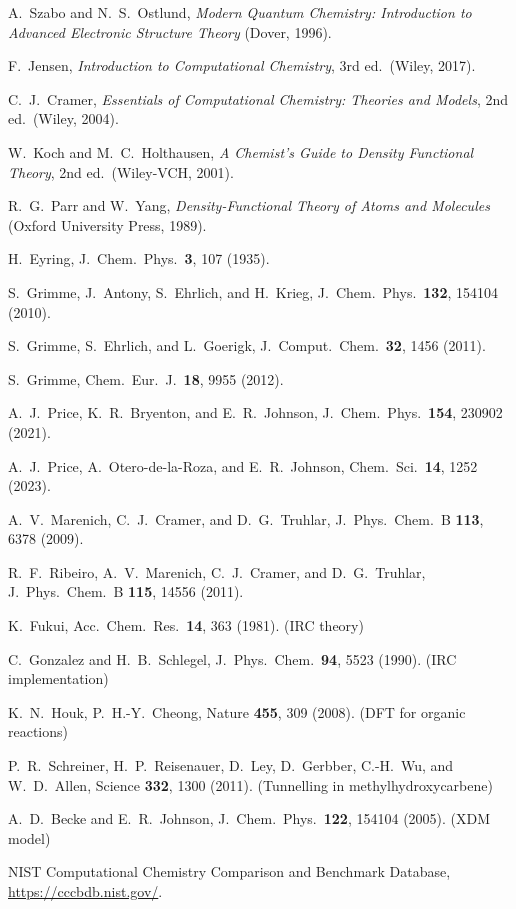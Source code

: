 \documentclass[11pt]{article}
\numberwithin{equation}{section}
\begin{document}
\begin{enumerate}[label={[\arabic*]},leftmargin=*]
 A.\ Szabo and N.\ S.\ Ostlund, \textit{Modern Quantum Chemistry: Introduction to Advanced Electronic Structure Theory} (Dover, 1996).

 F.\ Jensen, \textit{Introduction to Computational Chemistry}, 3rd ed.\ (Wiley, 2017).

 C.\ J.\ Cramer, \textit{Essentials of Computational Chemistry: Theories and Models}, 2nd ed.\ (Wiley, 2004).

 W.\ Koch and M.\ C.\ Holthausen, \textit{A Chemist's Guide to Density Functional Theory}, 2nd ed.\ (Wiley-VCH, 2001).

 R.\ G.\ Parr and W.\ Yang, \textit{Density-Functional Theory of Atoms and Molecules} (Oxford University Press, 1989).

 H.\ Eyring, J.\ Chem.\ Phys.\ \textbf{3}, 107 (1935).

 S.\ Grimme, J.\ Antony, S.\ Ehrlich, and H.\ Krieg, J.\ Chem.\ Phys.\ \textbf{132}, 154104 (2010).

 S.\ Grimme, S.\ Ehrlich, and L.\ Goerigk, J.\ Comput.\ Chem.\ \textbf{32}, 1456 (2011).

 S.\ Grimme, Chem.\ Eur.\ J.\ \textbf{18}, 9955 (2012).

 A.\ J.\ Price, K.\ R.\ Bryenton, and E.\ R.\ Johnson, J.\ Chem.\ Phys.\ \textbf{154}, 230902 (2021).

 A.\ J.\ Price, A.\ Otero-de-la-Roza, and E.\ R.\ Johnson, Chem.\ Sci.\ \textbf{14}, 1252 (2023).

 A.\ V.\ Marenich, C.\ J.\ Cramer, and D.\ G.\ Truhlar, J.\ Phys.\ Chem.\ B \textbf{113}, 6378 (2009).

 R.\ F.\ Ribeiro, A.\ V.\ Marenich, C.\ J.\ Cramer, and D.\ G.\ Truhlar, J.\ Phys.\ Chem.\ B \textbf{115}, 14556 (2011).

 K.\ Fukui, Acc.\ Chem.\ Res.\ \textbf{14}, 363 (1981). (IRC theory)

 C.\ Gonzalez and H.\ B.\ Schlegel, J.\ Phys.\ Chem.\ \textbf{94}, 5523 (1990). (IRC implementation)

 K.\ N.\ Houk, P.\ H.-Y.\ Cheong, Nature \textbf{455}, 309 (2008). (DFT for organic reactions)

 P.\ R.\ Schreiner, H.\ P.\ Reisenauer, D.\ Ley, D.\ Gerbber, C.-H.\ Wu, and W.\ D.\ Allen, Science \textbf{332}, 1300 (2011). (Tunnelling in methylhydroxycarbene)

 A.\ D.\ Becke and E.\ R.\ Johnson, J.\ Chem.\ Phys.\ \textbf{122}, 154104 (2005). (XDM model)

 NIST Computational Chemistry Comparison and Benchmark Database, \url{https://cccbdb.nist.gov/}.
\end{enumerate}
\end{document}
